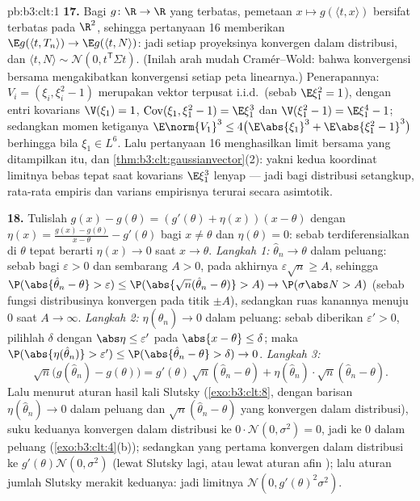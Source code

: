 \begin{solution}{pb:b3:clt:1}
\textbf{17.} Bagi $g \colon \R \to \R$ yang  terbatas,
pemetaan $x \mapsto g(\langle t, x\rangle)$ bersifat 
terbatas pada $\R^2$, sehingga pertanyaan 16 memberikan $\E g(\langle
t, T_n\rangle) \to \E g(\langle t, N\rangle)$: jadi setiap
proyeksinya konvergen dalam distribusi, dan $\langle t,
N\rangle \sim \mathcal N(0, t^{\mathsf T}\Sigma t)$. (Inilah
arah mudah Cramér--Wold: bahwa konvergensi bersama
mengakibatkan konvergensi setiap peta linearnya.) Penerapannya:
$V_i = (\xi_i, \xi_i^2 - 1)$ merupakan vektor terpusat i.i.d.\
(sebab $\E\xi_1^2 = 1$), dengan entri kovarians $\V(\xi_1) =
1$, $\operatorname{Cov}(\xi_1, \xi_1^2 - 1) = \E\xi_1^3$
dan $\V(\xi_1^2 - 1) = \E\xi_1^4 - 1$; sedangkan momen ketiganya
$\E\norm{V_1}^3 \leq 4\bigl(\E\abs{\xi_1}^3 +
\E\abs{\xi_1^2 - 1}^3\bigr)$ berhingga bila $\xi_1 \in
L^6$. Lalu pertanyaan 16 menghasilkan limit  bersama
yang ditampilkan itu, dan \cref{thm:b3:clt:gaussianvector}(2): yakni kedua
koordinat limitnya bebas tepat saat
kovarians $\E\xi_1^3$ lenyap --- jadi bagi distribusi setangkup,
rata-rata empiris dan varians empirisnya terurai
secara asimtotik.

\textbf{18.} Tulislah $g(x) - g(\theta) = (g'(\theta) +
\eta(x))(x - \theta)$ dengan $\eta(x) = \frac{g(x) -
g(\theta)}{x - \theta} - g'(\theta)$ bagi $x \neq \theta$
dan $\eta(\theta) = 0$: sebab terdiferensialkan di $\theta$
tepat berarti $\eta(x) \to 0$ saat $x \to \theta$.
\emph{Langkah 1:} $\hat\theta_n \to \theta$ dalam peluang:
sebab bagi $\varepsilon > 0$ dan sembarang $A > 0$, pada akhirnya
$\varepsilon\sqrt n \geq A$, sehingga $\P(\abs{\hat\theta_n -
\theta} > \varepsilon) \leq \P(\abs{\sqrt
n(\hat\theta_n - \theta)} > A) \to \P(\sigma\abs N > A)$
(sebab fungsi distribusinya konvergen pada titik 
$\pm A$), sedangkan ruas kanannya menuju $0$ saat $A \to
\infty$. \emph{Langkah 2:} $\eta(\hat\theta_n) \to 0$ dalam
peluang: sebab diberikan $\varepsilon' > 0$, pilihlah $\delta$ dengan
$\abs\eta \leq \varepsilon'$ pada $\abs{x - \theta} \leq
\delta$; maka $\P(\abs{\eta(\hat\theta_n)} > \varepsilon')
\leq \P(\abs{\hat\theta_n - \theta} > \delta) \to 0$.
\emph{Langkah 3:}
\[
\sqrt n\bigl(g(\hat\theta_n) - g(\theta)\bigr) =
g'(\theta)\,\sqrt n(\hat\theta_n - \theta) +
\eta(\hat\theta_n)\cdot\sqrt n(\hat\theta_n - \theta) .
\]
Lalu menurut aturan hasil kali Slutsky (\cref{exo:b3:clt:8}, dengan
barisan $\eta(\hat\theta_n) \to 0$ dalam peluang dan
$\sqrt n(\hat\theta_n - \theta)$ yang konvergen dalam distribusi),
suku keduanya konvergen dalam distribusi ke $0\cdot\mathcal N(0,
\sigma^2) = 0$, jadi ke $0$ dalam peluang
(\cref{exo:b3:clt:4}(b)); sedangkan yang pertama konvergen dalam distribusi ke
$g'(\theta)\mathcal N(0, \sigma^2)$ (lewat Slutsky lagi, atau lewat
aturan afin \omterm{def:b3:clt:cf}{fungsi karakteristiknya}); lalu aturan jumlah
Slutsky merakit keduanya: jadi limitnya $\mathcal N(0,
g'(\theta)^2\sigma^2)$.


\end{solution}
